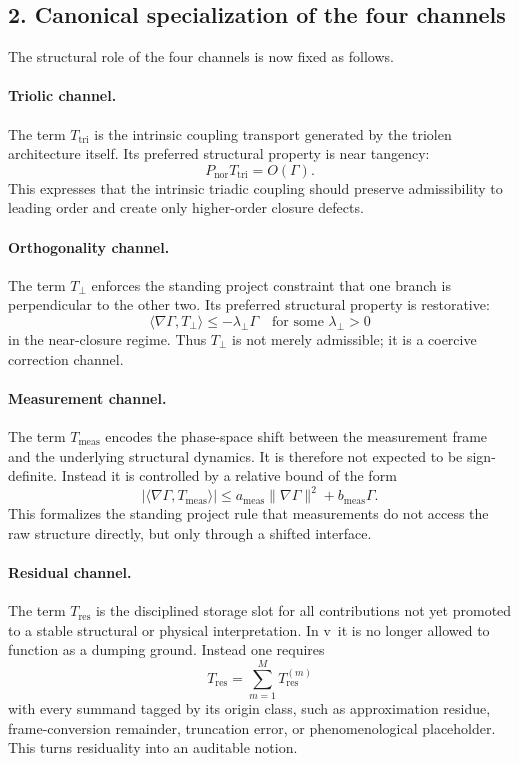 \subsection*{2. Canonical specialization of the four channels}
The structural role of the four channels is now fixed as follows.

\paragraph{Triolic channel.}
The term $T_{\mathrm{tri}}$ is the intrinsic coupling transport generated by the
triolen architecture itself. Its preferred structural property is near tangency:
\[
P_{\mathrm{nor}}T_{\mathrm{tri}} = O(\Gamma).
\]
This expresses that the intrinsic triadic coupling should preserve admissibility to
leading order and create only higher-order closure defects.

\paragraph{Orthogonality channel.}
The term $T_{\perp}$ enforces the standing project constraint that one branch is
perpendicular to the other two. Its preferred structural property is restorative:
\[
\langle \nabla\Gamma, T_{\perp}\rangle \le -\lambda_{\perp}\Gamma
\quad\text{for some }\lambda_{\perp}>0
\]
in the near-closure regime. Thus $T_{\perp}$ is not merely admissible; it is a
coercive correction channel.

\paragraph{Measurement channel.}
The term $T_{\mathrm{meas}}$ encodes the phase-space shift between the measurement
frame and the underlying structural dynamics. It is therefore not expected to be
sign-definite. Instead it is controlled by a relative bound of the form
\[
|\langle \nabla\Gamma, T_{\mathrm{meas}}\rangle|
\le a_{\mathrm{meas}}\|\nabla\Gamma\|^2 + b_{\mathrm{meas}}\Gamma.
\]
This formalizes the standing project rule that measurements do not access the raw
structure directly, but only through a shifted interface.

\paragraph{Residual channel.}
The term $T_{\mathrm{res}}$ is the disciplined storage slot for all contributions not
yet promoted to a stable structural or physical interpretation. In v\docversion\ it is no longer allowed to function as a dumping ground. Instead one requires
\[
T_{\mathrm{res}} = \sum_{m=1}^M T_{\mathrm{res}}^{(m)}
\]
with every summand tagged by its origin class, such as approximation residue,
frame-conversion remainder, truncation error, or phenomenological placeholder.
This turns residuality into an auditable notion.

